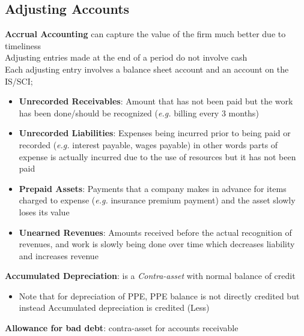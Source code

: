 \documentclass{article}
\newcommand{\eg}[0]{\textit{e.g. }}
\begin{document}
\begin{multicols}{2}
\section{Adjusting Accounts}
\textbf{Accrual Accounting} can capture the value of the firm much better due to timeliness\\
Adjusting entries made at the end of a period do not involve cash\\
Each adjusting entry involves a balance sheet account and an account on the IS/SCI;
\begin{itemize}
	\item \textbf{Unrecorded Receivables}: Amount that has not been paid but the work has been done/should be recognized (\eg billing every 3 months)
	\item \textbf{Unrecorded Liabilities}: Expenses being incurred prior to being paid or recorded (\eg interest payable, wages payable) in other words parts of expense is actually incurred due to the use of resources but it has not been paid
	\item \textbf{Prepaid Assets}: Payments that a company makes in advance for items charged to expense (\eg insurance premium payment) and the asset slowly loses its value
	\item \textbf{Unearned Revenues}: Amounts received before the actual recognition of revenues, and work is slowly being done over time which decreases liability and increases revenue
\end{itemize}
\textbf{Accumulated Depreciation}: is a \textit{Contra-asset} with normal balance of credit
\begin{itemize}
	\item Note that for depreciation of PPE, PPE balance is not directly credited but instead Accumulated depreciation is credited (Less)
\end{itemize}
\textbf{Allowance for bad debt}: contra-asset for accounts receivable
\begin{table}[H]
\end{table}
\end{multicols}
\end{document}
